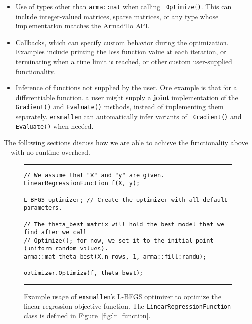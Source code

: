 \begin{itemize}
  \item Use of types other than {\tt arma::mat} when calling {\tt
Optimize()}.  This can include integer-valued matrices, sparse matrices, or any
type whose implementation matches the Armadillo API.

  \item Callbacks, which can specify custom behavior during the optimization.
Examples include printing the loss function value at each iteration, or
terminating when a time limit is reached, or other custom user-supplied
functionality.

  \item Inference of functions not supplied by the user.  One example is that
for a differentiable function, a user might supply a {\bf joint} implementation
of the {\tt Gradient()} and {\tt Evaluate()} methods, instead of implementing
them separately.  {\tt ensmallen} can automatically infer variants of {\tt
Gradient()} and {\tt Evaluate()} when needed.
\end{itemize}

The following sections discuss how we are able to achieve the
functionality above---with no runtime overhead.

\begin{figure}[t!]
\hrule
\vspace{1ex}
\begin{verbatim}
// We assume that "X" and "y" are given.
LinearRegressionFunction f(X, y);

L_BFGS optimizer; // Create the optimizer with all default parameters.

// The theta_best matrix will hold the best model that we find after we call
// Optimize(); for now, we set it to the initial point (uniform random values).
arma::mat theta_best(X.n_rows, 1, arma::fill:randu);

optimizer.Optimize(f, theta_best);
\end{verbatim}
\hrule
\vspace*{-0.5em}
\caption{Example usage of {\tt ensmallen}'s L-BFGS optimizer to optimize the
linear regression objective function.
The {\tt LinearRegressionFunction} class is defined in Figure~\ref{fig:lr_function}.
}
\label{fig:lbfgs_lr_opt}
\end{figure}
